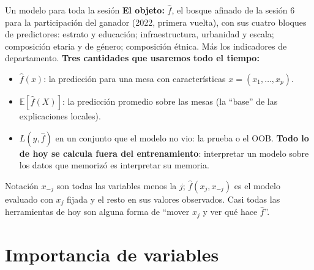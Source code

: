 \documentclass{beamer}
\newcommand{\E}{\mathbb{E}}
\newcommand{\1}{\mathbb{I}}
\begin{document}
\begin{frame}{Un modelo para toda la sesión}
\small
\textbf{El objeto:} $\hat{f}$, el bosque afinado de la sesión 6 para la participación del ganador (2022, primera vuelta), con sus cuatro bloques de predictores: estrato y educación; infraestructura, urbanidad y escala; composición etaria y de género; composición étnica. Más los indicadores de departamento.
\pause
\vspace{0.1cm}
\textbf{Tres cantidades que usaremos todo el tiempo:}
\begin{itemize}\itemsep3pt
  \item $\hat{f}(x)$: la predicción para una mesa con características $x = (x_1, \ldots, x_p)$.
  \item $\E[\hat{f}(X)]$: la predicción promedio sobre las mesas (la ``base'' de las explicaciones locales).
  \item $L(y, \hat{f})$ en un conjunto que el modelo no vio: la prueba o el OOB. \textbf{Todo lo de hoy se calcula fuera del entrenamiento}: interpretar un modelo sobre los datos que memorizó es interpretar su memoria.
\end{itemize}
\pause
\vspace{0.1cm}
\begin{block}{Notación}
$x_{-j}$ son todas las variables menos la $j$; $\hat{f}(x_j, x_{-j})$ es el modelo evaluado con $x_j$ fijada y el resto en sus valores observados. Casi todas las herramientas de hoy son alguna forma de ``mover $x_j$ y ver qué hace $\hat{f}$''.
\end{block}
\end{frame}


\section{Importancia de variables}
\begin{frame}[noframenumbering]
\tableofcontents[currentsection]
\end{frame}
\end{document}
